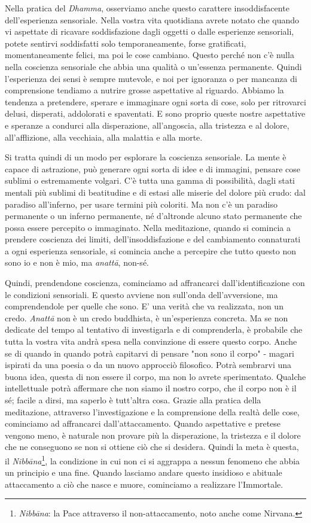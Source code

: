 Nella pratica del \textit{Dhamma}, osserviamo anche questo carattere
insoddisfacente dell'esperienza sensoriale. Nella vostra vita quotidiana
avrete notato che quando vi aspettate di ricavare soddisfazione dagli
oggetti o dalle esperienze sensoriali, potete sentirvi soddisfatti solo
temporaneamente, forse gratificati, momentaneamente felici, ma poi le
cose cambiano. Questo perché non c'è nulla nella coscienza sensoriale
che abbia una qualità o un'essenza permanente. Quindi l'esperienza dei
sensi è sempre mutevole, e noi per ignoranza o per mancanza di
comprensione tendiamo a nutrire grosse aspettative al riguardo. Abbiamo
la tendenza a pretendere, sperare e immaginare ogni sorta di cose, solo
per ritrovarci delusi, disperati, addolorati e spaventati. E sono
proprio queste nostre aspettative e speranze a condurci alla
disperazione, all'angoscia, alla tristezza e al dolore, all'afflizione,
alla vecchiaia, alla malattia e alla morte.

Si tratta quindi di un modo per esplorare la coscienza sensoriale. La
mente è capace di astrazione, può generare ogni sorta di idee e di
immagini, pensare cose sublimi o estremamente volgari. C'è tutta una
gamma di possibilità, dagli stati mentali più sublimi di beatitudine e
di estasi alle miserie del dolore più crudo: dal paradiso all'inferno,
per usare termini più coloriti. Ma non c'è un paradiso permanente o un
inferno permanente, né d'altronde alcuno stato permanente che possa
essere percepito o immaginato. Nella meditazione, quando si comincia a
prendere coscienza dei limiti, dell'insoddisfazione e del cambiamento
connaturati a ogni esperienza sensoriale, si comincia anche a percepire
che tutto questo non sono io e non è mio, ma \textit{anattā}, non-sé.

Quindi, prendendone coscienza, cominciamo ad affrancarci
dall'identificazione con le condizioni sensoriali. E questo avviene non
sull'onda dell'avversione, ma comprendendole per quelle che sono. E' una
verità che va realizzata, non un credo. \textit{Anattā} non è un credo buddhista,
è un'esperienza concreta. Ma se non dedicate del tempo al tentativo di
investigarla e di comprenderla, è probabile che tutta la vostra vita
andrà spesa nella convinzione di essere questo corpo. Anche se di quando
in quando potrà capitarvi di pensare "non sono il corpo" - magari
ispirati da una poesia o da un nuovo approcciò filosofico. Potrà
sembrarvi una buona idea, questa di non essere il corpo, ma non lo
avrete sperimentato. Qualche intellettuale potrà affermare che non siamo
il nostro corpo, che il corpo non è il sé; facile a dirsi, ma saperlo è
tutt'altra cosa. Grazie alla pratica della meditazione, attraverso
l'investigazione e la comprensione della realtà delle cose, cominciamo
ad affrancarci dall'attaccamento. Quando aspettative e pretese vengono
meno, è naturale non provare più la disperazione, la tristezza e il
dolore che ne conseguono se non si ottiene ciò che si desidera. Quindi
la meta è questa, il \textit{Nibbāna}\footnote{\textit{Nibbāna}: la Pace attraverso il non-attaccamento, noto
anche come Nirvana.}, la condizione in cui non ci si
aggrappa a nessun fenomeno che abbia un principio e una fine. Quando
lasciamo andare questo insidioso e abituale attaccamento a ciò che nasce
e muore, cominciamo a realizzare l'Immortale.

